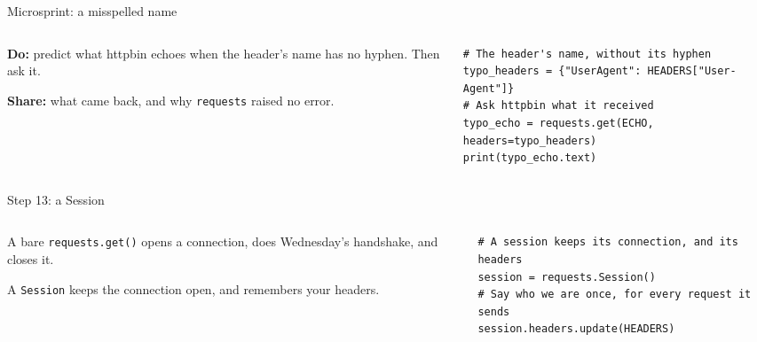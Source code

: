 \documentclass[9pt,aspectratio=169]{beamer}
\begin{document}
\begin{frame}[fragile]{Microsprint: a misspelled name}
    \begin{columns}[T]
        \begin{column}{0.37\textwidth}
            \textbf{Do:} predict what httpbin echoes when the header's name has no hyphen. Then ask it.

            \medskip
            \textbf{Share:} what came back, and why \texttt{requests} raised no error.
        \end{column}
        \begin{column}{0.6\textwidth}
\begin{lstlisting}[style=lab]
# The header's name, without its hyphen
typo_headers = {"UserAgent": HEADERS["User-Agent"]}
# Ask httpbin what it received
typo_echo = requests.get(ECHO, headers=typo_headers)
print(typo_echo.text)
\end{lstlisting}
        \end{column}
    \end{columns}
\end{frame}

\begin{frame}[fragile]{Step 13: a Session}
    \begin{columns}[T]
        \begin{column}{0.37\textwidth}
            A bare \texttt{requests.get()} opens a connection, does Wednesday's handshake, and closes it.

            \medskip
            A \texttt{Session} keeps the connection open, and remembers your headers.
        \end{column}
        \begin{column}{0.6\textwidth}
\begin{lstlisting}[style=lab]
# A session keeps its connection, and its headers
session = requests.Session()
# Say who we are once, for every request it sends
session.headers.update(HEADERS)
\end{lstlisting}
        \end{column}
    \end{columns}
\end{frame}
\end{document}
